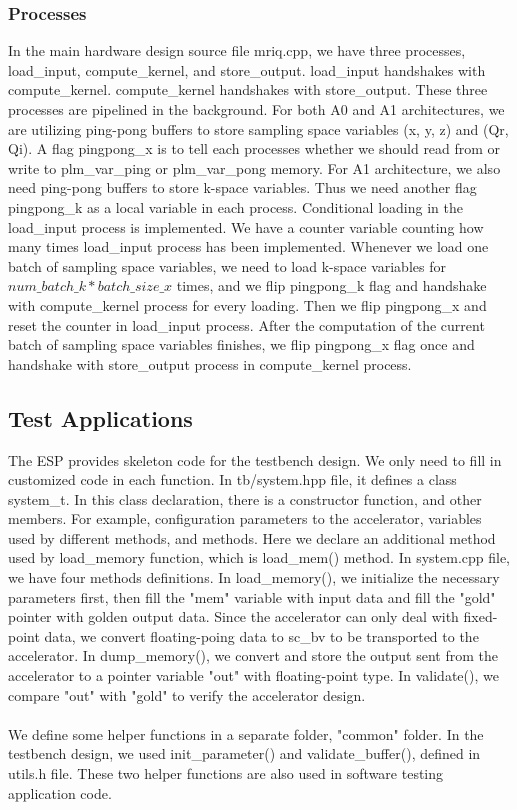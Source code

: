 \subsubsection{Processes}

In the main hardware design source file mriq.cpp, we have three processes,
load\_input, compute\_kernel, and store\_output. load\_input handshakes with
compute\_kernel. compute\_kernel handshakes with store\_output. These three
processes are pipelined in the background. For both A0 and A1 architectures, we
are utilizing ping-pong buffers to store sampling space variables (x, y, z) and
(Qr, Qi). A flag pingpong\_x is to tell each processes whether we should read
from or write to plm\_var\_ping or plm\_var\_pong memory. For A1 architecture,
we also need ping-pong buffers to store k-space variables. Thus we need another
flag pingpong\_k as a local variable in each process. Conditional loading in the
load\_input process is implemented. We have a counter variable counting how many
times load\_input process has been implemented. Whenever we load one batch of
sampling space variables, we need to load k-space variables for $num\_batch\_k *
batch\_size\_x$ times, and we flip pingpong\_k flag and handshake with
compute\_kernel process for every loading. Then we flip pingpong\_x and reset
the counter in load\_input process. After the computation of the current batch
of sampling space variables finishes, we flip pingpong\_x flag once and
handshake with store\_output process in compute\_kernel process. \\

\subsection{Test Applications}

The ESP provides skeleton code for the testbench design. We only need to fill in
customized code in each function. In tb/system.hpp file, it defines a class
system\_t. In this class declaration, there is a constructor function, and other
members. For example, configuration parameters to the accelerator, variables
used by different methods, and methods. Here we declare an additional method
used by load\_memory function, which is load\_mem() method. In system.cpp file,
we have four methods definitions. In load\_memory(), we initialize the necessary
parameters first, then fill the "mem" variable with input data and fill the
"gold" pointer with golden output data. Since the accelerator can only deal with
fixed-point data, we convert floating-poing data to sc\_bv to be transported to
the accelerator. In dump\_memory(), we convert and store the output sent from
the accelerator to a pointer variable "out" with floating-point type. In
validate(), we compare "out" with "gold" to verify the accelerator
design. \\ \\ We define some helper functions in a separate folder, "common"
folder. In the testbench design, we used init\_parameter() and
validate\_buffer(), defined in utils.h file. These two helper functions are also
used in software testing application code.\\

